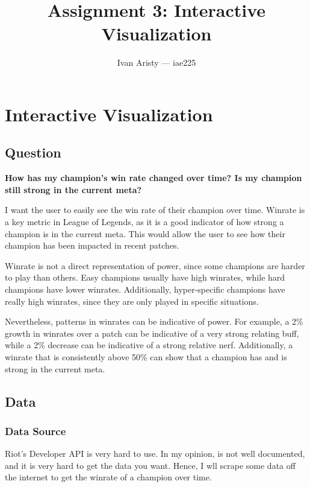 \documentclass{article}
\title{Assignment 3: Interactive Visualization}
\author{Ivan Aristy — iae225}
\begin{document}
  \maketitle %
  \thispagestyle{empty}

\section{Interactive Visualization}
\label{sec:sec1}

\subsection{Question }
\label{subsec:subsec1}

\textbf{How has my champion's win rate changed over time? Is my champion still strong in the current meta?}

I want the user to easily see the win rate of their champion over time. 
Winrate is a key metric in League of Legends, as it is a good indicator of how strong a champion is in the current meta.
This would allow the user to see how their champion has been impacted in recent patches.

Winrate is not a direct representation of power, since some champions are harder to play than others.
Easy champions usually have high winrates, while hard champions have lower winrates.
Additionally, hyper-specific champions have really high winrates, since they are only played in specific situations.

Nevertheless, patterns in winrates can be indicative of power. For example, a 2\% growth in winrates
over a patch can be indicative of a very strong relating buff, while a 2\% decrease can be indicative of a strong relative nerf.
Additionally, a winrate that is consistently above 50\% can show that a champion has and is strong in the current meta.

\subsection{Data}
\label{subsec:subsec2}

\subsubsection{Data Source}
\label{subsubsec:Data Source}

Riot's Developer API is very hard to use. In my opinion, is not well documented, and it is very hard to get the data you want.
Hence, I wll scrape some data off the internet to get the winrate of a champion over time.
\end{document}
